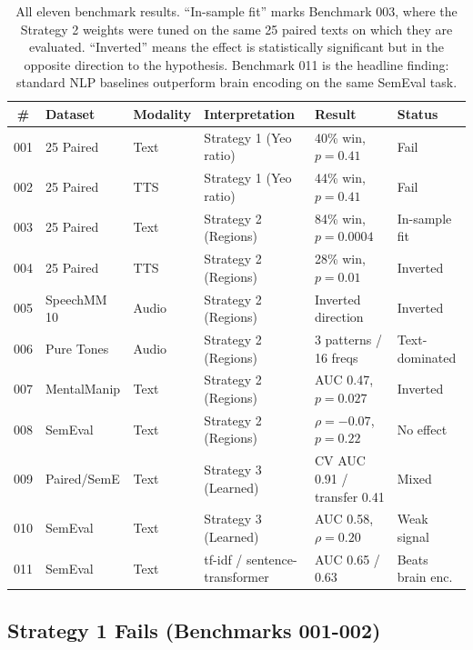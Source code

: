 \documentclass[11pt]{article}
\begin{document}
\begin{table}[t]
    \centering
    \small
    \begin{tabular}{@{}clllll@{}}
        \toprule
        \# & Dataset & Modality & Interpretation & Result & Status \\
        \midrule
        001 & 25 Paired   & Text   & Strategy 1 (Yeo ratio)        & 40\% win, $p=0.41$          & Fail \\
        002 & 25 Paired   & TTS    & Strategy 1 (Yeo ratio)        & 44\% win, $p=0.41$          & Fail \\
        003 & 25 Paired   & Text   & Strategy 2 (Regions)          & 84\% win, $p=0.0004$        & In-sample fit \\
        004 & 25 Paired   & TTS    & Strategy 2 (Regions)          & 28\% win, $p=0.01$          & Inverted \\
        005 & SpeechMM 10 & Audio  & Strategy 2 (Regions)          & Inverted direction          & Inverted \\
        006 & Pure Tones  & Audio  & Strategy 2 (Regions)          & 3 patterns / 16 freqs       & Text-dominated \\
        007 & MentalManip & Text   & Strategy 2 (Regions)          & AUC 0.47, $p=0.027$         & Inverted \\
        008 & SemEval     & Text   & Strategy 2 (Regions)          & $\rho=-0.07$, $p=0.22$      & No effect \\
        009 & Paired/SemE & Text   & Strategy 3 (Learned)          & CV AUC 0.91 / transfer 0.41 & Mixed \\
        010 & SemEval     & Text   & Strategy 3 (Learned)          & AUC 0.58, $\rho=0.20$       & Weak signal \\
        011 & SemEval     & Text   & tf-idf / sentence-transformer & AUC 0.65 / 0.63             & Beats brain enc. \\
        \bottomrule
    \end{tabular}
    \caption{All eleven benchmark results. ``In-sample fit'' marks Benchmark 003, where the Strategy 2 weights were tuned on the same 25 paired texts on which they are evaluated. ``Inverted'' means the effect is statistically significant but in the opposite direction to the hypothesis. Benchmark 011 is the headline finding: standard NLP baselines outperform brain encoding on the same SemEval task.}
    \label{tab:all-results}
\end{table}

\subsection{Strategy 1 Fails (Benchmarks 001-002)}
\end{document}
